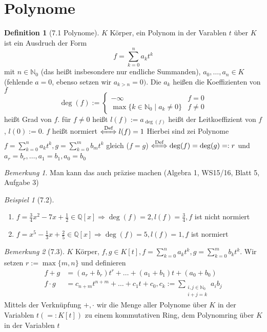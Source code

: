 \documentclass[a4paper]{scrartcl}
\theoremstyle{definition}
\newtheorem{defn}{Definition}
\theoremstyle{plain}
\theoremstyle{plain}
\theoremstyle{remark}
\newtheorem{remark}{Bemerkung}
\theoremstyle{remark}
\theoremstyle{remark}
\newtheorem{ex}{Beispiel}
\begin{document}
\section{Polynome}
\label{sec-4}
\begin{defn}[7.1 Polynome]
$K$ Körper, ein Polynom in der Varablen $t$ über $K$ ist ein Ausdruch der Form
\[f = \sum_{k = 0}^n a_k t^k\]
mit $n\in\mathbb{N}_0$ (das heißt insbesondere nur endliche Summanden), $a_0,\ldots,a_n \in K$ (fehlende $a = 0$, ebenso setzen wir $a_{k > n} = 0)$. Die $a_k$ heißen die Koeffizienten von $f$
\[\deg(f) := \begin{cases}-\infty & f = 0 \\  \max\{k\in\mathbb{N}_0 \mid a_k \neq 0\} & f\neq 0\end{cases}\]
heißt Grad von $f$. für $f\neq 0$ heißt $l(f) := a_{\deg(f)}$ heißt der Leitkoeffizient von $f$, $l(0) := 0$. $f$ heißt normiert $\xLeftrightarrow{\text{Def}} l(f) = 1$
Hierbei sind zei Polynome $f = \sum_{k = 0}^n a_k t^k,g = \sum_{k =0}^m b_m t^k$ gleich ($f = g$) $\xLeftrightarrow{\text{Def}} \deg(f) = \deg(g) =: r$ und $a_r = b_r,\ldots,a_1 = b_1, a_0 = b_0$
\end{defn}
\begin{remark}
Man kann das auch präzise machen (Algebra 1, WS15/16, Blatt 5, Aufgabe 3)
\end{remark}
\begin{ex}[7.2] \mbox{}
\begin{enumerate}
\item $f = \frac{3}{4}x^2 - 7 x + \frac{1}{2} \in \mathbb{Q}[x] \Rightarrow \deg(f) = 2, l(f) = \frac{3}{4}, f$ ist nicht normiert
\item $f = x^5 - \frac{1}{3} x + \frac{2}{5} \in\mathbb{Q}[x] \Rightarrow \deg(f) = 5, l(f) = 1, f$ ist normiert
\end{enumerate}
\end{ex}
\begin{remark}[7.3]
$K$ Körper, $f,g \in K[t], f = \sum_{k = 0}^n a_k t^k, g = \sum_{k = 0}^m b_k t^k$. Wir setzen $r:= \max\{m,n\}$ und definieren
\begin{align*}
f + g &= (a_r + b_r)t^r + \ldots + (a_1 + b_1)t + (a_0 + b_0) \\
f \cdot g &= c_{n + m} t^{n + m} + \ldots + c_1 t + c_0, c_k := \sum_{\substack{i,j \in\mathbb{N}_0 \\ i + j = k}} a_i b_j
\end{align*}
Mittels der Verknüpfung $+,\cdot$ wir die Menge aller Polynome über $K$ in der Variablen $t (=: K[t])$ zu einem kommutativen Ring, dem Polynomring über $K$ in der Variablen $t$
\end{remark}
\end{document}
